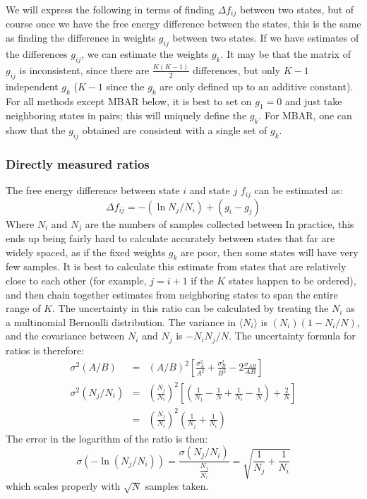 \documentclass[superscriptaddress,showkeys, nofootinbib, pre, aps]{revtex4-1}
\begin{document}
We will express the following in terms of finding $\Delta f_{ij}$ between two states, but of course once we have the free energy difference between the states, this is the same as finding the difference in weights $g_{ij}$ between two states. If we have estimates of the differences $g_{ij}$, we can estimate the weights $g_k$.  It may be that the matrix of $g_{ij}$ is inconsistent, since there are $\frac{K(K-1)}{2}$ differences, but only $K-1$ independent $g_k$ ($K-1$ since the $g_k$ are only defined up to an additive constant). For all methods except MBAR below, it is best to set on $g_1 = 0$ and just take neighboring states in pairs; this will uniquely define the $g_k$. For MBAR, one can show that the $g_{ij}$ obtained are consistent with a single set of $g_k$.

\subsubsection{Directly measured ratios}

The free energy difference between state $i$ and state $j$ $f_{ij}$ can be estimated as:
\[
\Delta f_{ij} = -(\ln N_j/N_i) + (g_{i}-g_{j})
\]
Where $N_i$ and $N_j$ are the numbers of samples collected between 
In practice, this ends up being fairly hard to calculate accurately between states that far are widely spaced, as if the fixed weights $g_k$ are poor, then some states will have very few samples. It is best to calculate this estimate from states that are relatively close to each other (for example, $j = i+1$ if the $K$ states happen to be ordered), and then chain together estimates from neighboring states to span the entire range of
$K$. 
The uncertainty in this ratio can be calculated by treating the $N_i$ as a multinomial Bernoulli distribution.  The variance in $\langle N_i\rangle$ is $(N_i)(1-N_i/N)$, and the covariance between $N_i$ and $N_j$ is $-N_iN_j/N$. The uncertainty formula for ratios is therefore:
\begin{eqnarray}
\sigma^2(A/B) &=& (A/B)^2\left[\frac{\sigma_A^2}{A^2} + \frac{\sigma_B^2}{B^2}-2\frac{\sigma_{AB}}{AB}\right] \\
 \sigma^2(N_j/N_i)&=& \left(\frac{N_j}{N_i}\right)^2\left[ \left(\frac{1}{N_j}-\frac{1}{N}+\frac{1}{N_i}-\frac{1}{N}\right)+\frac{2}{N}\right] \\
&=& \left(\frac{N_j}{N_i}
\right)^2\left(\frac{1}{N_j}+\frac{1}{N_i}\right)
\end{eqnarray}
The error in the logarithm of the ratio is then:
\begin{equation}
\sigma(-\ln(N_j/N_i)) = \frac{\sigma(N_j/N_i)}{\frac{N_j}{N_i}}  = \sqrt{\frac{1}{N_j}+\frac{1}{N_i}}
\end{equation}
which scales properly with $\sqrt{N}$ samples taken.
\end{document}
